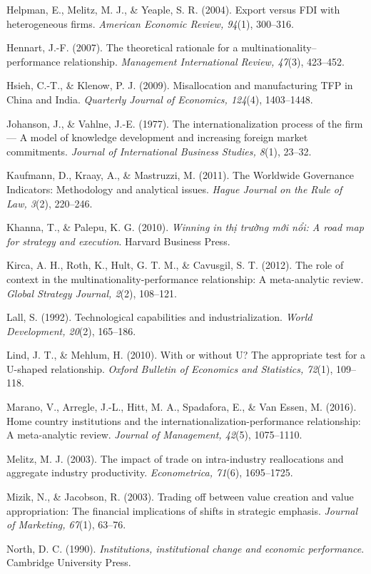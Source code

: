 \documentclass[
  a4paper,
  13pt]{extreport}
\begin{document}
Helpman, E., Melitz, M. J., \& Yeaple, S. R. (2004). Export versus FDI
with heterogeneous firms. \emph{American Economic Review, 94}(1),
300--316.

Hennart, J.-F. (2007). The theoretical rationale for a
multinationality--performance relationship. \emph{Management
International Review, 47}(3), 423--452.

Hsieh, C.-T., \& Klenow, P. J. (2009). Misallocation and manufacturing
TFP in China and India. \emph{Quarterly Journal of Economics, 124}(4),
1403--1448.

Johanson, J., \& Vahlne, J.-E. (1977). The internationalization process
of the firm --- A model of knowledge development and increasing foreign
market commitments. \emph{Journal of International Business Studies,
8}(1), 23--32.

Kaufmann, D., Kraay, A., \& Mastruzzi, M. (2011). The Worldwide
Governance Indicators: Methodology and analytical issues. \emph{Hague
Journal on the Rule of Law, 3}(2), 220--246.

Khanna, T., \& Palepu, K. G. (2010). \emph{Winning in thị trường mới
nổi: A road map for strategy and execution}. Harvard Business Press.

Kirca, A. H., Roth, K., Hult, G. T. M., \& Cavusgil, S. T. (2012). The
role of context in the multinationality-performance relationship: A
meta-analytic review. \emph{Global Strategy Journal, 2}(2), 108--121.

Lall, S. (1992). Technological capabilities and industrialization.
\emph{World Development, 20}(2), 165--186.

Lind, J. T., \& Mehlum, H. (2010). With or without U? The appropriate
test for a U-shaped relationship. \emph{Oxford Bulletin of Economics and
Statistics, 72}(1), 109--118.

Marano, V., Arregle, J.-L., Hitt, M. A., Spadafora, E., \& Van Essen, M.
(2016). Home country institutions and the
internationalization-performance relationship: A meta-analytic review.
\emph{Journal of Management, 42}(5), 1075--1110.

Melitz, M. J. (2003). The impact of trade on intra-industry
reallocations and aggregate industry productivity. \emph{Econometrica,
71}(6), 1695--1725.

Mizik, N., \& Jacobson, R. (2003). Trading off between value creation
and value appropriation: The financial implications of shifts in
strategic emphasis. \emph{Journal of Marketing, 67}(1), 63--76.

North, D. C. (1990). \emph{Institutions, institutional change and
economic performance}. Cambridge University Press.
\end{document}
